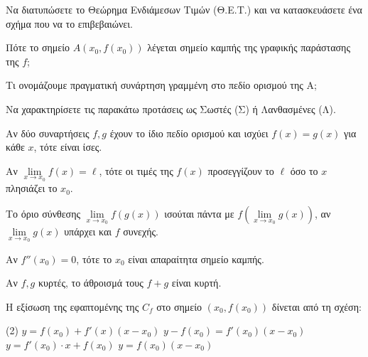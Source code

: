 \documentclass[11pt,a4paper]{article}
\newcommand{\kerkissans}[1]{{\fontfamily{maksf}\selectfont \textbf{#1}}}
\renewcommand{\textdexiakeraia}{}
\newcommand\themanum{A}
\newcounter{thema}[section]
\renewcommand{\thethema}{\arabic{thema}}
\newcommand{\Thema}{\refstepcounter{thema}{\textbf{\textcolor{black}{\faPenSquare\ \  \large \kerkissans{\textbf{\thethemaο\hspace{2mm}Διαγώνισμα - Θέμα \themanum}}}}}\hspace{0mm}}{}
\newenvironment{thema}[1]
{\begin{tcolorbox}[title=\Thema\kerkissans{\textbf{\large{  #1}}},breakable,
enhanced standard,titlerule=0pt,toprule=0pt, rightrule=0pt, bottomrule=0pt,
colback=white,left=0mm,top=1mm,bottom=0mm,
boxrule=0pt,
colframe=white,leftrule=0mm,sharp corners,coltitle=black]
\renewcommand{\themanum}{#1}}
{\end{tcolorbox}}
\begin{document}
\begin{thema}{A}
\begin{erwthma}
    \item Να διατυπώσετε το Θεώρημα Ενδιάμεσων Τιμών (Θ.Ε.Τ.) και να κατασκευάσετε ένα σχήμα που να το επιβεβαιώνει.
    \item Πότε το σημείο $A(x_0, f(x_0))$ λέγεται σημείο καμπής της γραφικής παράστασης της $f$;
    \item Τι ονομάζουμε πραγματική συνάρτηση γραμμένη στο πεδίο ορισμού της Α;
    \item Να χαρακτηρίσετε τις παρακάτω προτάσεις ως Σωστές (Σ) ή Λανθασμένες (Λ).
    \begin{alist}
        \item Αν δύο συναρτήσεις $f, g$ έχουν το ίδιο πεδίο ορισμού και ισχύει $f(x)=g(x)$ για κάθε $x$, τότε είναι ίσες.
        \item Αν $\lim\limits_{x\to x_0} f(x) = \ell$, τότε οι τιμές της $f(x)$ προσεγγίζουν το $\ell$ όσο το $x$ πλησιάζει το $x_0$.
        \item Το όριο σύνθεσης $\lim\limits_{x\to x_0} f(g(x))$ ισούται πάντα με $f(\lim\limits_{x\to x_0} g(x))$, αν $\lim\limits_{x\to x_0} g(x)$ υπάρχει και $f$ συνεχής.
        \item Αν $f''(x_0) = 0$, τότε το $x_0$ είναι απαραίτητα σημείο καμπής.
        \item Αν $f, g$ κυρτές, το άθροισμά τους $f+g$ είναι κυρτή.
    \end{alist}
    \item Η εξίσωση της εφαπτομένης της $C_f$ στο σημείο $(x_0, f(x_0))$ δίνεται από τη σχέση:
    \begin{tasks}[label=\let\textdexiakeraia\relax\alph*.](2)
        \task $y = f(x_0) + f'(x)(x - x_0)$
        \task $y - f(x_0) = f'(x_0)(x - x_0)$
        \task $y = f'(x_0) \cdot x + f(x_0)$
        \task $y = f(x_0)(x - x_0)$
    \end{tasks}
\end{erwthma}
\end{thema}
\vspace{1cm}
\end{document}
